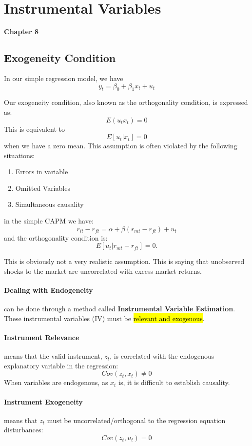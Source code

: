 \documentclass[11pt]{article}
\begin{document}
\section{Instrumental Variables}
\textbf{Chapter 8}
\subsection{Exogeneity Condition}
In our simple regression model, we have 
\[y_t = \beta_0 + \beta_1 x_t + u_t\]

Our exogeneity condition, also known as the orthogonality condition, is expressed as:
\[E(u_tx_t)=0\]
This is equivalent to 
\[E[u_t|x_t] = 0\]
when we have a zero mean. This assumption is often violated by the following situations:

\begin{enumerate}
    \item Errors in variable
    \item Omitted Variables
    \item Simultaneous causality
\end{enumerate}

in the simple CAPM we have:
\[r_{it} - r_{ft} = \alpha + \beta(r_{mt}-r_{ft})+ u_t\]
and the orthogonality condition is:
\[E[u_t|r_{mt}-r_{ft}] = 0.\]

This is obviously not a very realistic assumption. This is saying that unobserved shocks to the market are uncorrelated with excess market returns.

\paragraph{Dealing with Endogeneity} can be done through a method called \textbf{Instrumental Variable Estimation}. These instrumental variables (IV) must be \hl{relevant and exogenous}.

\paragraph{Instrument Relevance} means that the valid instrument, $z_t$, is correlated with the endogenous explanatory variable in the regression:
\[Cov(z_t, x_t)\neq0\]
When variables are endogenous, as $x_t$ is, it is difficult to establish causality.

\paragraph{Instrument Exogeneity} means that $z_t$ must be uncorrelated/orthogonal to the regression equation disturbances:
\[Cov(z_t,u_t)=0\]
\end{document}
